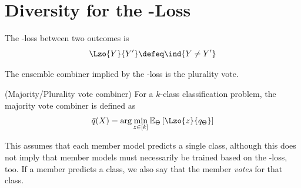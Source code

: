 \documentclass[../main.tex]{subfiles}
\begin{document}







\section{Diversity for the \zeroone-Loss}

\begin{definition}
\label{def:zeroone-loss}
The \zeroone-loss between two outcomes is 
$$
\Lzo{Y}{Y'} \defeq \ind{Y \not= Y'}
$$
\end{definition}

The ensemble combiner implied by the \zeroone-loss is the plurality vote.
\begin{definition} 
   \label{def:majority-vote} 
    (Majority/Plurality vote combiner) For a $k$-class classification problem, the majority vote combiner is defined as
$$
\bar{q}(X) = \arg\min_{z \in [k]} \mathbb{E}_{\Theta}\left[ \Lzo{z}{q_{\Theta}} \right]  
$$
\end{definition}
This assumes that each member model predicts a single class, although this does not imply that member models must necessarily be trained based on the \zeroone-loss, too. If a member predicts a class, we also say that the member \textit{votes} for that class.
\end{document}
